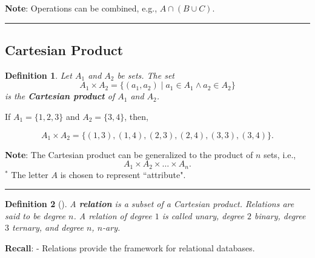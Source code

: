 \documentclass{article}
\newtheorem{definition}{Definition}
\begin{document}
\textbf{Note}: Operations can be combined, e.g., $A\cap (B \cup C)$.
  
  
  
  
  

 \hspace{-0.5cm}\rule[-0.101in]{\textwidth}{0.0025in}


 \subsection*{Cartesian Product}
 \begin{definition}
        
Let $A_1$ and $A_2$ be sets.  The set 
\[
A_1 \times A_2 = \{(a_1, a_2) \; | \; a_1 \in A_1 \wedge a_2 \in A_2 \} 
\]
is the \textbf{Cartesian product} of $A_1$ and $A_2$.  

 \end{definition} 
  
  
  


\begin{example}
If $A_1 = \{1, 2, 3\}$ and $A_2 = \{ 3,4\}$, then, 

\[
A_1 \times A_2 = \{(1,3), (1,4), (2,3), (2,4), (3,3),(3,4) \}.
\]
\end{example}

\noindent \textbf{Note}: The Cartesian product can be generalized to the product of  $n$ sets, i.e., 
\[ 
A_1 \times A_2 \times \dots \times A_n.
\]   
$^*$ The letter $A$ is chosen to represent ``attribute".




 
\hspace{-0.5cm}\rule[0.01in]{\textwidth}{0.0025in}
 
  
  
  
  
  
 \begin{definition}[]
 A \textbf{relation} is a subset of a Cartesian product.  Relations are said to be degree $n$.  A relation of degree $1$ is called unary, degree $2$ binary, degree $3$ ternary, and degree $n$, $n$-ary.    
 \end{definition} 
  
 
 \noindent \textbf{Recall}:  - Relations provide the framework for relational databases.   
 
\end{document}
